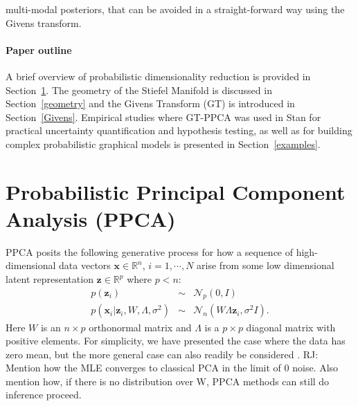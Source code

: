 \documentclass{article}
\newcommand{\commentRJ}[1]{{\textcolor{commentRJ_color}{RJ: #1}}}
\newcommand{\mb}[1]{\mathbf{#1}}
\begin{document}
multi-modal posteriors, that can be avoided in a straight-forward way using the Givens transform.

\paragraph{Paper outline} A brief overview of probabilistic dimensionality reduction is provided in Section~\ref{Probabilistic dimensionality reduction}. The geometry of the Stiefel Manifold is discussed in Section~\ref{geometry} and the Givens Transform (GT) is introduced in Section~\ref{Givens}. Empirical studies where GT-PPCA was used in Stan for practical uncertainty quantification and hypothesis testing, as well as for building complex probabilistic graphical models is presented in Section~\ref{examples}.


\section{Probabilistic Principal Component Analysis (PPCA)} \label{Probabilistic dimensionality reduction}

PPCA posits the following generative process for how a sequence of high-dimensional data vectors $\mathbf{x} \in \mathbb{R}^n$, $i = 1, \cdots, N$ arise from some low dimensional latent representation $\mathbf{z} \in \mathbb{R}^p$ where $p < n$:
\begin{eqnarray}
\label{eq:PpcaGenerativeProcess}
p(\mb{z}_i) &\sim& \mathcal{N}_p(0, I) \nonumber\\
p(\mb{x}_i | \mb{z}_i, W, \Lambda, \sigma^2) &\sim& \mathcal{N}_n(W \Lambda \mb{z}_i, \sigma^2 I).
\end{eqnarray}
Here $W$ is an $n \times p$ orthonormal matrix and $\Lambda$ is a $p \times p$ diagonal matrix with positive elements.  For simplicity, we have presented the case where the data has zero mean, but the more general case can also readily be considered \citep[chapt.~12.1]{murphy2012machine}. \commentRJ{Mention how the MLE converges to classical PCA in the limit of 0 noise.  Also mention how, if there is no distribution over W, PPCA methods can still do inference proceed.} 
\end{document}
